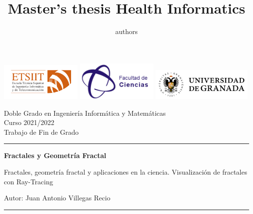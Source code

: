 \documentclass[11pt]{report}
\title{Master's thesis Health Informatics \the\year}
\author{authors}
\begin{document}
\renewcommand{\figurename}{Imagen}
\renewcommand{\listfigurename}{Lista de Imágenes}


\thispagestyle{empty}
\begin{titlepage}
    \hspace{-1.5cm}
	\includegraphics[width=40mm]{img/LogoETSIIT.png}
	\includegraphics[width=40mm]{img/LogoFacultadCiencias.jpeg}
	\hfill
	\includegraphics[width=50mm]{img/LogoUGR.png}
	
	\noindent\begin{small} \sffamily
		\begin{minipage}{0.65\textwidth}
			Doble Grado en Ingeniería Informática y Matemáticas\\
			Curso 2021/2022\\
			Trabajo de Fin de Grado\\
		\end{minipage}
	\hrule
	\end{small}

	\vspace{1cm}
	{\LARGE\noindent \textbf{Fractales y Geometría Fractal} \par}
	\vspace{0.5cm}
	{\Large\noindent Fractales, geometría fractal y aplicaciones en la ciencia. Visualización de fractales con Ray-Tracing \par}
	\vspace{2cm}
	{\LARGE\noindent Autor: Juan Antonio Villegas Recio \par} 
	
	\vfill
		
	\hrule
	\vspace{0.3cm}
	

\end{titlepage}
\end{document}
